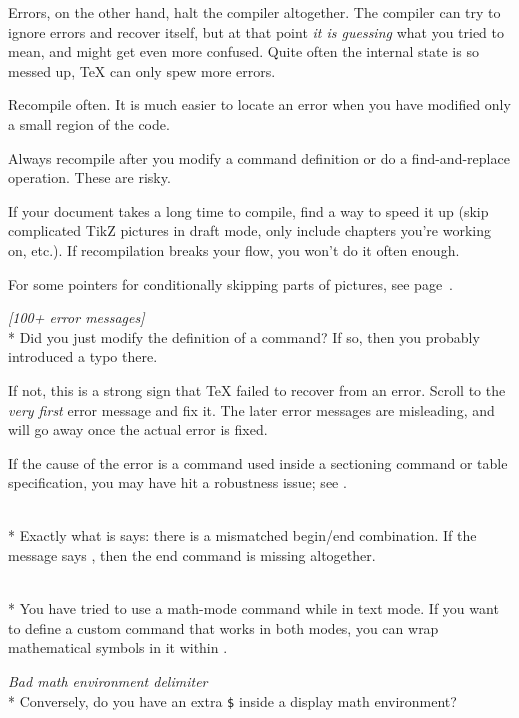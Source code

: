 Errors, on the other hand, halt the compiler altogether.
The compiler can try to ignore errors and recover itself,
but at that point \emph{it is guessing} what you tried to mean,
and might get even more confused.
Quite often the internal state is so messed up, \TeX{} can only spew more errors.


\begin{practices}
Recompile often.
It is much easier to locate an error when you have modified only a small region of the code.

Always recompile after you modify a command definition
or do a find-and-replace operation.
These are risky.

If your document takes a long time to compile,
find a way to speed it up
(skip complicated TikZ pictures in draft mode, only include chapters you're working on, etc.).
If recompilation breaks your flow, you won't do it often enough.

For some pointers for conditionally skipping parts of pictures, see page~\pageref{ex:booleans}.
\end{practices}


\medskip\noindent\emph{[100+ error messages]}\\*
Did you just modify the definition of a command?
If so, then you probably introduced a typo there.

If not, this is a strong sign that \TeX{} failed to recover from an error.
Scroll to the \emph{very first} error message and fix it.
The later error messages are misleading,
and will go away once the actual error is fixed.

If the cause of the error is a command used inside a sectioning command or table specification,
you may have hit a robustness issue; see .

\medskip{}\\*
Exactly what is says: there is a mismatched begin/end combination.
If the message says \verb||, then the end command is missing altogether.

\medskip{}\\*
You have tried to use a math-mode command while in text mode.
If you want to define a custom command that works in both modes,
you can wrap mathematical symbols in it within .

\medskip\noindent\emph{Bad math environment delimiter}\\*
Conversely, do you have an extra \verb|$| inside a display math environment?

